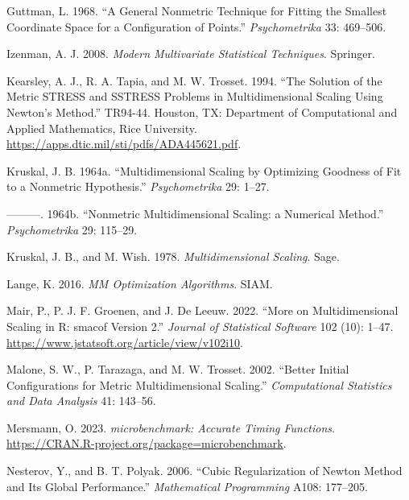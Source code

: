 \documentclass[
  12pt,
]{article}
\newlength{\cslhangindent}
\newenvironment{CSLReferences}[2] %
 {\begin{list}{}{%
  \setlength{\itemindent}{0pt}
  \setlength{\leftmargin}{0pt}
  \setlength{\parsep}{0pt}
  \ifodd #1
   \setlength{\leftmargin}{\cslhangindent}
   \setlength{\itemindent}{-1\cslhangindent}
  \fi
  \setlength{\itemsep}{#2\baselineskip}}}
 {\end{list}}
\begin{document}
\begin{CSLReferences}{1}{0}
Guttman, L. 1968. {``{A General Nonmetric Technique for Fitting the Smallest Coordinate Space for a Configuration of Points}.''} \emph{Psychometrika} 33: 469--506.

Izenman, A. J. 2008. \emph{Modern Multivariate Statistical Techniques}. Springer.

Kearsley, A. J., R. A. Tapia, and M. W. Trosset. 1994. {``{The Solution of the Metric STRESS and SSTRESS Problems in Multidimensional Scaling Using Newton's Method}.''} TR94-44. Houston, TX: {Department of Computational and Applied Mathematics, Rice University}. \url{https://apps.dtic.mil/sti/pdfs/ADA445621.pdf}.

Kruskal, J. B. 1964a. {``{Multidimensional Scaling by Optimizing Goodness of Fit to a Nonmetric Hypothesis}.''} \emph{Psychometrika} 29: 1--27.

---------. 1964b. {``{Nonmetric Multidimensional Scaling: a Numerical Method}.''} \emph{Psychometrika} 29: 115--29.

Kruskal, J. B., and M. Wish. 1978. \emph{Multidimensional Scaling}. Sage.

Lange, K. 2016. \emph{MM Optimization Algorithms}. SIAM.

Mair, P., P. J. F. Groenen, and J. De Leeuw. 2022. {``{More on Multidimensional Scaling in R: smacof Version 2}.''} \emph{Journal of Statistical Software} 102 (10): 1--47. \url{https://www.jstatsoft.org/article/view/v102i10}.

Malone, S. W., P. Tarazaga, and M. W. Trosset. 2002. {``Better Initial Configurations for Metric Multidimensional Scaling.''} \emph{Computational Statistics and Data Analysis} 41: 143--56.

Mersmann, O. 2023. \emph{{microbenchmark: Accurate Timing Functions}}. \url{https://CRAN.R-project.org/package=microbenchmark}.

Nesterov, Y., and B. T. Polyak. 2006. {``Cubic Regularization of Newton Method and Its Global Performance.''} \emph{Mathematical Programming} A108: 177--205.


\end{CSLReferences}
\end{document}
